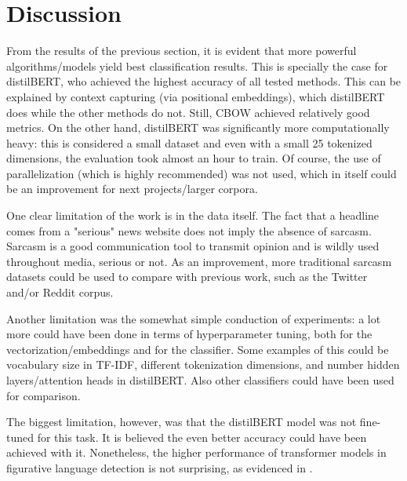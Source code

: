 \thispagestyle{plain}

\section{Discussion}

From the results of the previous section, it is evident that more powerful algorithms/models yield best classification results. This is specially the case for distilBERT, who achieved the highest accuracy of all tested methods. This can be explained by context capturing (via positional embeddings), which distilBERT does while the other methods do not. Still, CBOW achieved relatively good metrics. On the other hand, distilBERT was significantly more computationally heavy: this is considered a small dataset and even with a small 25 tokenized dimensions, the evaluation took almost an hour to train. Of course, the use of parallelization (which is highly recommended) was not used, which in itself could be an improvement for next projects/larger corpora.

One clear limitation of the work is in the data itself. The fact that a headline comes from a "serious" news website does not imply the absence of sarcasm. Sarcasm is a good communication tool to transmit opinion and is wildly used throughout media, serious or not. As an improvement, more traditional sarcasm datasets could be used to compare with previous work, such as the Twitter and/or Reddit corpus.

Another limitation was the somewhat simple conduction of experiments: a lot more could have been done in terms of hyperparameter tuning, both for the vectorization/embeddings and for the classifier. Some examples of this could be vocabulary size in TF-IDF, different tokenization dimensions, and number hidden layers/attention heads in distilBERT. Also other classifiers could have been used for comparison.

The biggest limitation, however, was that the distilBERT model was not fine-tuned for this task.  It is believed the even better accuracy could have been achieved with it. Nonetheless, the higher performance of transformer models in figurative language detection is not surprising, as evidenced in \citep{potamias2020}.